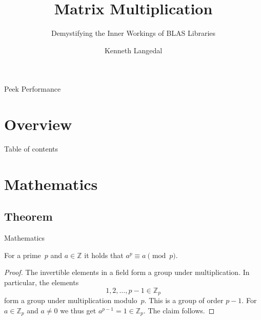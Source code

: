 \documentclass[UKenglish]{beamer}
\author{Kenneth Langedal}
\title{Matrix Multiplication}
\subtitle{Demystifying the Inner Workings of BLAS Libraries}
\begin{document}
\begin{frame}{Peek Performance}
\end{frame}

\section{Overview}
%
%
\begin{frame}{Table of contents}
    \tableofcontents[currentsection]
\end{frame}

\section{Mathematics}
\subsection{Theorem}

\begin{frame}{Mathematics}
    \begin{theorem}
        For a prime~\(p\) and \(a \in \mathbb{Z}\) it holds that \(a^p \equiv a
        \pmod{p}\).
    \end{theorem}

    \begin{proof}
        The invertible elements in a field form a group under multiplication.
        In particular, the elements
        \begin{equation*}
            1, 2, \ldots, p - 1 \in \mathbb{Z}_p
        \end{equation*}
        form a group under multiplication modulo~\(p\).
        This is a group of order \(p - 1\).
        For \(a \in \mathbb{Z}_p\) and \(a \neq 0\) we thus get \(a^{p-1} = 1
        \in \mathbb{Z}_p\).
        The claim follows.
    \end{proof}
\end{frame}
\end{document}
